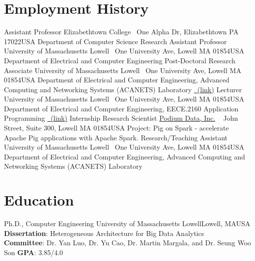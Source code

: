 \documentclass[11pt]{moderncv}
\begin{document}
\section{Employment History}
%
        {Assistant Professor}%
        {\small Elizabethtown College}%
        {\small ~\hfill\break One Alpha Dr, Elizabethtown PA 17022}{USA}%
        {Department of Computer Science}
%
%
        {Research Assistant Professor}%
        {\small University of Massachusetts Lowell}%
        {\small ~\hfill\break One University Ave, Lowell MA 01854}{USA}%
        {Department of Electrical and Computer Engineering}
%
%
        {Post-Doctoral Research Associate}%
        {\small University of Massachusetts Lowell}%
        {\small ~\hfill\break One University Ave, Lowell MA 01854}{USA}%
        {Department of Electrical and Computer Engineering, \newline
         Advanced Computing and Networking Systems (ACANETS) Laboratory \href{http://acanets.uml.edu/}{\color{color2}\homepagesymbol~(link)}
        }
%
%
        {Lecturer}%
        {\small University of Massachusetts Lowell}%
        {\small ~\hfill\break One University Ave, Lowell MA 01854}{USA}%
        {Department of Electrical and Computer Engineering, \newline
         EECE.2160 Application Programming \href{http://mjgeiger.github.io/eece2160/}{\color{color2}\homepagesymbol~(link)}
        }
%
%
        {Internship Research Scientist}%
        {\small \href{http://www.podiumdata.com/}{Podium Data, Inc.}}%
        {\small ~\hfill{} John Street, Suite 300, Lowell MA 01854}{USA}%
        {Project: Pig on Spark - accelerate Apache Pig applications with Apache Spark.
        }
%
        {Research/Teaching Assistant}%
        {\small University of Massachusetts Lowell}%
        {\small ~\hfill\break One University Ave, Lowell MA 01854}{USA}%
        {Department of Electrical and Computer Engineering, \newline
         Advanced Computing and Networking Systems (ACANETS) Laboratory
        }

\pagebreak

\section{Education}
        {Ph.D., Computer Engineering}
        {University of Massachusetts Lowell}{Lowell, MA}{USA}
        {\textbf{Dissertation}: Heterogeneous Architecture for Big Data Analytics\\
         \textbf{Committee}: Dr. Yan Luo, Dr. Yu Cao, Dr. Martin Margala, and Dr. Seung Woo Son
         \textbf{GPA}: 3.85/4.0}  %
\end{document}
